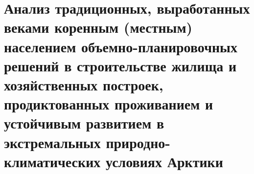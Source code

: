 \chapter{Анализ традиционных, выработанных веками коренным (местным) населением объемно-планировочных решений в строительстве жилища и хозяйственных построек, продиктованных проживанием и устойчивым развитием в экстремальных природно-климатических условиях Арктики}

